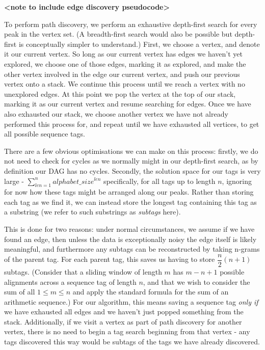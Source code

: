 \documentclass{l4proj}
\begin{document}
\textbf{<note to include edge discovery pseudocode>}

To perform path discovery, we perform an exhaustive depth-first search for every peak in the vertex set. (A breadth-first search would also be possible but depth-first is conceptually simpler to understand.) First, we choose a vertex, and denote it our current vertex. So long as our current vertex has edges we haven't yet explored, we choose one of those edges, marking it as explored, and make the other vertex involved in the edge our current vertex, and push our previous vertex onto a stack. We continue this process until we reach a vertex with no unexplored edges. At this point we pop the vertex at the top of our stack, marking it as our current vertex and resume searching for edges. Once we have also exhausted our stack, we choose another vertex we have not already performed this process for, and repeat until we have exhausted all vertices, to get all possible sequence tags.

There are a few obvious optimisations we can make on this process: firstly, we do not need to check for cycles as we normally might in our depth-first search, as by definition our DAG has no cycles. Secondly, the solution space for our tags is very large - \(\sum_{len=1}^{n}{alphabet\_size^{len}}\) specifically, for all tags up to length \(n\), ignoring for now how these tags might be arranged along our peaks. Rather than storing each tag as we find it, we can instead store the longest tag containing this tag as a substring (we refer to such substrings as \textit{subtags} here). 

This is done for two reasons: under normal circumstances, we assume if we have found an edge, then unless the data is exceptionally noisy the edge itself is likely meaningful, and furthermore any subtags can be reconstructed by taking n-grams of the parent tag. For each parent tag, this saves us having to store \(\dfrac{n}{2}(n+1)\) subtags. (Consider that a sliding window of length \(m\) has \(m-n+1\) possible alignments across a sequence tag of length \(n\), and that we wish to consider the sum of all \(1 \leq m \leq n\) and apply the standard formula for the sum of an arithmetic sequence.) For our algorithm, this means saving a sequence tag \textit{only if} we have exhausted all edges and we haven't just popped something from the stack. Additionally, if we visit a vertex as part of path discovery for another vertex, there is no need to begin a tag search beginning from that vertex - any tags discovered this way would be subtags of the tags we have already discovered.
\end{document}
